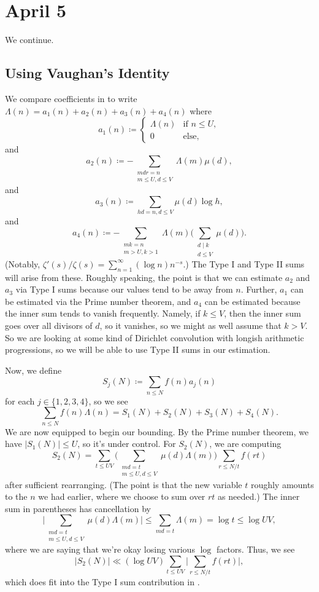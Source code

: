 \documentclass[../notes.tex]{subfiles}
\begin{document}
\section{April 5}

We continue.

\subsection{Using Vaughan's Identity}
We compare coefficients in  to write $\Lambda(n)=a_1(n)+a_2(n)+a_3(n)+a_4(n)$ where
\[a_1(n)\coloneqq\begin{cases}
	\Lambda(n) & \text{if }n\le U, \\
	0 & \text{else},
\end{cases}\]
and
\[a_2(n)\coloneqq-\sum_{\substack{mdr=n\\m\le U,d\le V}}\Lambda(m)\mu(d),\]
and
\[a_3(n)\coloneqq\sum_{hd=n,d\le V}\mu(d)\log h,\]
and
\[a_4(n)\coloneqq-\sum_{\substack{mk=n\\m>U,k>1}}\Lambda(m)\Bigg(\sum_{\substack{d\mid k\\d\le V}}\mu(d)\Bigg).\]
(Notably, $\zeta'(s)/\zeta(s)=\sum_{n=1}^\infty(\log n)n^{-s}$.) The Type I and Type II sums will arise from these. Roughly speaking, the point is that we can estimate $a_2$ and $a_3$ via Type I sums because our values tend to be away from $n$. Further, $a_1$ can be estimated via the Prime number theorem, and $a_4$ can be estimated because the inner sum tends to vanish frequently. Namely, if $k\le V$, then the inner sum goes over all divisors of $d$, so it vanishes, so we might as well assume that $k>V$. So we are looking at some kind of Dirichlet convolution with longish arithmetic progressions, so we will be able to use Type II sums in our estimation.

Now, we define
\[S_j(N)\coloneqq\sum_{n\le N}f(n)a_j(n)\]
for each $j\in\{1,2,3,4\}$, so we see
\[\sum_{n\le N}f(n)\Lambda(n)=S_1(N)+S_2(N)+S_3(N)+S_4(N).\]
We are now equipped to begin our bounding. By the Prime number theorem, we have $|S_1(N)|\le U$, so it's under control. For $S_2(N)$, we are computing
\[S_2(N)=\sum_{t\le UV}\Bigg(\sum_{\substack{md=t\\m\le U,d\le V}}\mu(d)\Lambda(m)\Bigg)\sum_{r\le N/t}f(rt)\]
after sufficient rearranging. (The point is that the new variable $t$ roughly amounts to the $n$ we had earlier, where we choose to sum over $rt$ as needed.) The inner sum in parentheses has cancellation by
\[\Bigg|\sum_{\substack{md=t\\m\le U,d\le V}}\mu(d)\Lambda(m)\Bigg|\le\sum_{md=t}\Lambda(m)=\log t\le\log UV,\]
where we are saying that we're okay losing various $\log$ factors. Thus, we see
\[|S_2(N)|\ll(\log UV)\sum_{t\le UV}\Bigg|\sum_{r\le N/t}f(rt)\Bigg|,\]
which does fit into the Type I sum contribution in .
\end{document}
